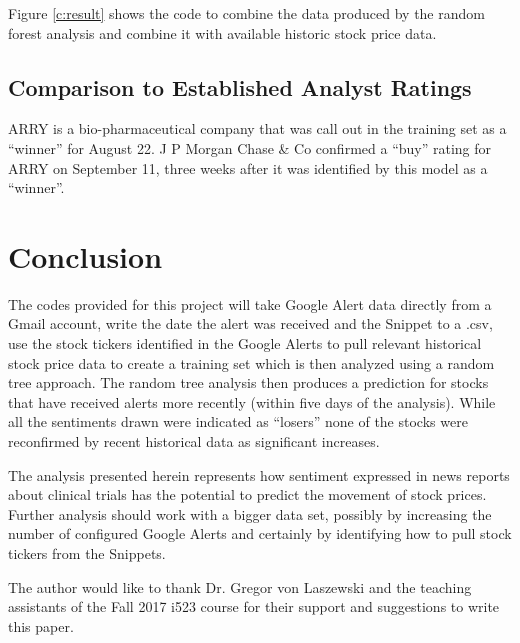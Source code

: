 \documentclass[sigconf]{acmart}
\begin{document}
Figure \ref{c:result} shows the code to combine the data produced by the random forest analysis and combine it with available historic stock price data.

\subsection{Comparison to Established Analyst Ratings}

ARRY is a bio-pharmaceutical company that was call out in the training set as a ``winner'' for August 22. J P Morgan Chase \& Co confirmed a ``buy'' rating for ARRY on September 11, three weeks after it was identified by this model as a ``winner''.



\section{Conclusion}
The codes provided for this project will take Google Alert data directly from a Gmail account, write the date the alert was received and the Snippet to a .csv, use the stock tickers identified in the Google Alerts to pull relevant historical stock price data to create a training set which is then analyzed using a random tree approach. The random tree analysis then produces a prediction for stocks that have received alerts more recently (within five days of the analysis). While all the sentiments drawn were indicated as ``losers'' none of the stocks were reconfirmed by recent historical data as significant increases. 

The analysis presented herein represents how sentiment expressed in news reports about clinical trials has the potential to predict the movement of stock prices. Further analysis should work with a bigger data set, possibly by increasing the number of configured Google Alerts and certainly by identifying how to pull stock tickers from the Snippets. 

\begin{acks}

The author would like to thank Dr. Gregor von Laszewski and the teaching assistants of the Fall 2017 i523 course for their support and suggestions to write this paper.

\end{acks}


 
\end{document}
